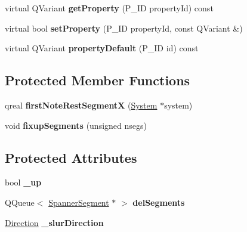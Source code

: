 \begin{DoxyCompactItemize}
\item 
\mbox{\label{class_ms_1_1_slur_tie_a575c653cf484e095915f5a20bc5dc887}} 
virtual Q\+Variant {\bfseries get\+Property} (P\+\_\+\+ID property\+Id) const
\item 
\mbox{\label{class_ms_1_1_slur_tie_ac0bade447ce8a6c0ada882ef638e8497}} 
virtual bool {\bfseries set\+Property} (P\+\_\+\+ID property\+Id, const Q\+Variant \&)
\item 
\mbox{\label{class_ms_1_1_slur_tie_a7995d9513b653fe0ad93cfa9b89bdb5c}} 
virtual Q\+Variant {\bfseries property\+Default} (P\+\_\+\+ID id) const
\end{DoxyCompactItemize}
\subsection*{Protected Member Functions}
\begin{DoxyCompactItemize}
\item 
\mbox{\label{class_ms_1_1_slur_tie_a6246aa7bae9d958d95b64c74918fb214}} 
qreal {\bfseries first\+Note\+Rest\+SegmentX} (\hyperlink{class_ms_1_1_system}{System} $\ast$system)
\item 
\mbox{\label{class_ms_1_1_slur_tie_af43c557b7494be9084a01b55fe1746be}} 
void {\bfseries fixup\+Segments} (unsigned nsegs)
\end{DoxyCompactItemize}
\subsection*{Protected Attributes}
\begin{DoxyCompactItemize}
\item 
\mbox{\label{class_ms_1_1_slur_tie_a7fc1970446e20666c8f1be3c342c4840}} 
bool {\bfseries \+\_\+up}
\item 
\mbox{\label{class_ms_1_1_slur_tie_ac366dc094c1b519cca968f829f2d74d0}} 
Q\+Queue$<$ \hyperlink{class_ms_1_1_spanner_segment}{Spanner\+Segment} $\ast$ $>$ {\bfseries del\+Segments}
\item 
\mbox{\label{class_ms_1_1_slur_tie_a445bfba1dc8164c30b2f9b06012860be}} 
\hyperlink{class_ms_1_1_direction}{Direction} {\bfseries \+\_\+slur\+Direction}
\end{DoxyCompactItemize}
